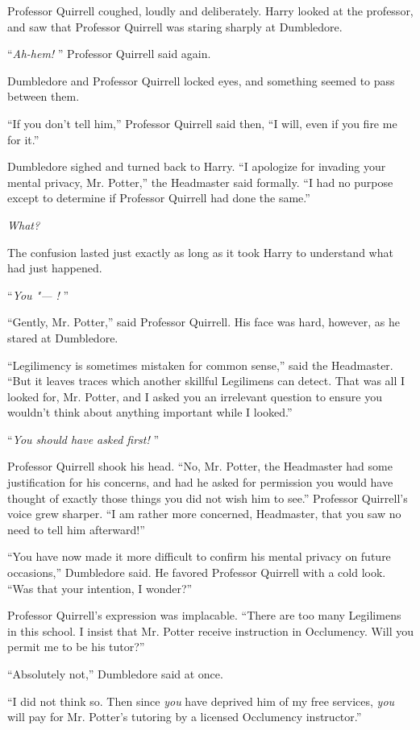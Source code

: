 Professor Quirrell coughed, loudly and deliberately. Harry looked at the
professor, and saw that Professor Quirrell was staring sharply at
Dumbledore.

``\emph{Ah-hem!} '' Professor Quirrell said again.

Dumbledore and Professor Quirrell locked eyes, and something seemed to
pass between them.

``If you don't tell him,'' Professor Quirrell said then, ``I will, even
if you fire me for it.''

Dumbledore sighed and turned back to Harry. ``I apologize for invading
your mental privacy, Mr. Potter,'' the Headmaster said formally. ``I had
no purpose except to determine if Professor Quirrell had done the
same.''

\emph{What?}

The confusion lasted just exactly as long as it took Harry to understand
what had just happened.

``\emph{You "--- !} ''

``Gently, Mr. Potter,'' said Professor Quirrell. His face was hard,
however, as he stared at Dumbledore.

``Legilimency is sometimes mistaken for common sense,'' said the
Headmaster. ``But it leaves traces which another skillful Legilimens can
detect. That was all I looked for, Mr. Potter, and I asked you an
irrelevant question to ensure you wouldn't think about anything
important while I looked.''

``\emph{You should have asked first!} ''

Professor Quirrell shook his head. ``No, Mr. Potter, the Headmaster had
some justification for his concerns, and had he asked for permission you
would have thought of exactly those things you did not wish him to
see.'' Professor Quirrell's voice grew sharper. ``I am rather more
concerned, Headmaster, that you saw no need to tell him afterward!''

``You have now made it more difficult to confirm his mental privacy on
future occasions,'' Dumbledore said. He favored Professor Quirrell with
a cold look. ``Was that your intention, I wonder?''

Professor Quirrell's expression was implacable. ``There are too many
Legilimens in this school. I insist that Mr. Potter receive instruction
in Occlumency. Will you permit me to be his tutor?''

``Absolutely not,'' Dumbledore said at once.

``I did not think so. Then since \emph{you} have deprived him of my free
services, \emph{you} will pay for Mr. Potter's tutoring by a licensed
Occlumency instructor.''

